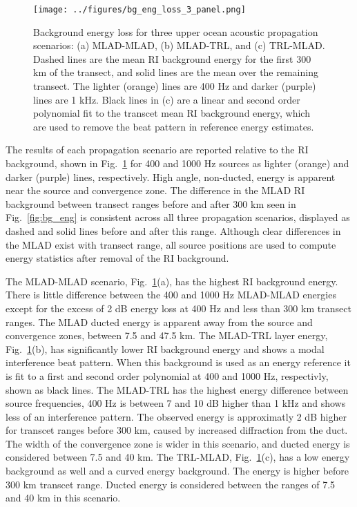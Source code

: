 \documentclass[preprint,NumberedRefs]{JASA}
\begin{document}
\begin{figure}
\texttt{[image: ../figures/bg\_eng\_loss\_3\_panel.png]}
        \caption{Background energy loss for three upper ocean acoustic propagation scenarios: (a) MLAD-MLAD, (b) MLAD-TRL, and (c) TRL-MLAD. Dashed lines are the mean RI background energy for the first 300 km of the transect, and solid lines are the mean over the remaining transect. The lighter (orange) lines are 400 Hz and darker (purple) lines are 1 kHz. Black lines in (c) are a linear and second order polynomial fit to the transcet mean RI background energy, which are used to remove the beat pattern in reference energy estimates.}
    \label{fig:eng_bg_3}
\end{figure}

The results of each propagation scenario are reported relative to the RI background, shown in Fig.~\ref{fig:eng_bg_3} for 400 and 1000 Hz sources as lighter (orange) and darker (purple) lines, respectively. High angle, non-ducted, energy is apparent near the source and convergence zone. The difference in the MLAD RI background between transect ranges before and after 300 km seen in Fig.~\ref{fig:bg_eng} is consistent across all three propagation scenarios, displayed as dashed and solid lines before and after this range. Although clear differences in the MLAD exist with transect range, all source positions are used to compute energy statistics after removal of the RI background.

The MLAD-MLAD scenario, Fig.~\ref{fig:eng_bg_3}(a), has the highest RI background energy. There is little difference between the 400 and 1000 Hz MLAD-MLAD energies except for the excess of 2 dB energy loss at 400 Hz and less than 300 km transect ranges. The MLAD ducted energy is apparent away from the source and convergence zones, between 7.5 and 47.5 km. The MLAD-TRL layer energy, Fig.~\ref{fig:eng_bg_3}(b), has significantly lower RI background energy and shows a modal interference beat pattern. When this background is used as an energy reference it is fit to a first and second order polynomial at 400 and 1000 Hz, respectivly, shown as black lines. The MLAD-TRL has the highest energy difference between source frequencies, 400 Hz is between 7 and 10 dB higher than 1 kHz and shows less of an interference pattern. The observed energy is approximatly 2 dB higher for transcet ranges before 300 km, caused by increased diffraction from the duct. The width of the convergence zone is wider in this scenario, and ducted energy is considered between 7.5 and 40 km. The TRL-MLAD, Fig.~\ref{fig:eng_bg_3}(c), has a low energy background as well and a curved energy background. The energy is higher before 300 km transcet range. Ducted energy is considered between the ranges of 7.5 and 40 km in this scenario.
\end{document}
